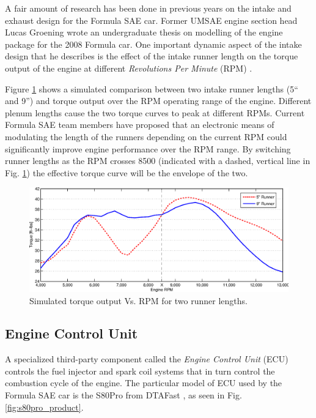 
A fair amount of research has been done in previous years on the intake and exhaust design for the Formula SAE car. Former UMSAE engine section head Lucas Groening wrote an undergraduate thesis on modelling of the engine package for the 2008 Formula car. One important dynamic aspect of the intake design that he describes is the effect of the intake runner length on the torque output of the engine at different \emph{Revolutions Per Minute} (RPM) \cite{LucasIntake}. 

Figure \ref{fig:irl_effect} shows a simulated comparison between two intake runner lengths (5`` and 9'') and torque output over the RPM operating range of the engine. Different plenum lengths cause the two torque curves to peak at different RPMs. Current Formula SAE team members have proposed that an electronic means of modulating the length of the runners depending on the current RPM could significantly improve engine performance over the RPM range. By switching runner lengths as the RPM crosses 8500 (indicated with a dashed, vertical line in Fig. \ref{fig:irl_effect}) the effective torque curve will be the envelope of the two.

\begin{figure}[H]
\centering
\includegraphics[width=6in,keepaspectratio]{background/figures/irl_effect2.eps}
\caption{Simulated torque output Vs. RPM for two runner lengths.}
\label{fig:irl_effect}
\end{figure}

\subsection{Engine Control Unit}
\label{sec:ECU}


A specialized third-party component called the \emph{Engine Control Unit} (ECU) controls the fuel injector and spark coil systems that in turn control the combustion cycle of the engine. The particular model of ECU used by the Formula SAE car is the S80Pro from DTAFast \cite{s80pro}, as seen in Fig. \ref{fig:s80pro_product}.


